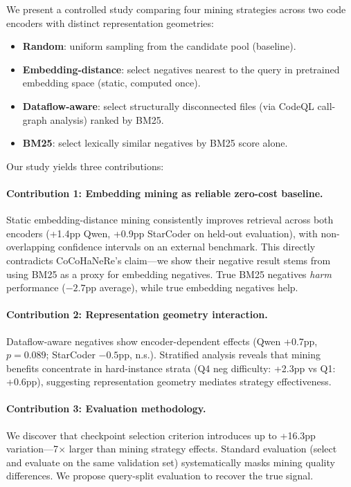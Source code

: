 \documentclass[11pt,a4paper]{article}
\begin{document}
We present a controlled study comparing four mining strategies across two code encoders with distinct representation geometries:
\begin{itemize}
\item \textbf{Random}: uniform sampling from the candidate pool (baseline).
\item \textbf{Embedding-distance}: select negatives nearest to the query in pretrained embedding space (static, computed once).
\item \textbf{Dataflow-aware}: select structurally disconnected files (via CodeQL call-graph analysis) ranked by BM25.
\item \textbf{BM25}: select lexically similar negatives by BM25 score alone.
\end{itemize}

Our study yields three contributions:

\paragraph{Contribution 1: Embedding mining as reliable zero-cost baseline.} Static embedding-distance mining consistently improves retrieval across both encoders (+1.4pp Qwen, +0.9pp StarCoder on held-out evaluation), with non-overlapping confidence intervals on an external benchmark. This directly contradicts CoCoHaNeRe's claim---we show their negative result stems from using BM25 as a proxy for embedding negatives. True BM25 negatives \emph{harm} performance ($-2.7$pp average), while true embedding negatives help.

\paragraph{Contribution 2: Representation geometry interaction.} Dataflow-aware negatives show encoder-dependent effects (Qwen +0.7pp, $p=0.089$; StarCoder $-0.5$pp, n.s.). Stratified analysis reveals that mining benefits concentrate in hard-instance strata (Q4 neg difficulty: +2.3pp vs Q1: +0.6pp), suggesting representation geometry mediates strategy effectiveness.

\paragraph{Contribution 3: Evaluation methodology.} We discover that checkpoint selection criterion introduces up to +16.3pp variation---7$\times$ larger than mining strategy effects. Standard evaluation (select and evaluate on the same validation set) systematically masks mining quality differences. We propose query-split evaluation to recover the true signal.
\end{document}
